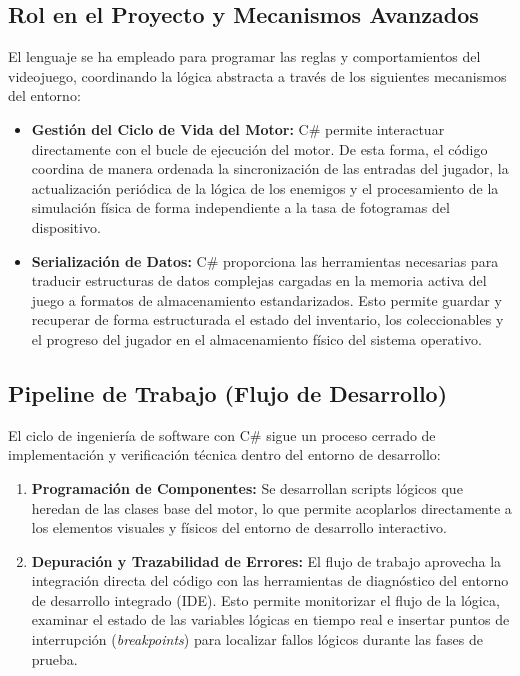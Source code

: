 \subsection{Rol en el Proyecto y Mecanismos Avanzados}
El lenguaje se ha empleado para programar las reglas y comportamientos del videojuego, coordinando la lógica abstracta a través de los siguientes mecanismos del entorno:

\begin{itemize}
    \item \textbf{Gestión del Ciclo de Vida del Motor:} C\# permite interactuar directamente con el bucle de ejecución del motor. De esta forma, el código coordina de manera ordenada la sincronización de las entradas del jugador, la actualización periódica de la lógica de los enemigos y el procesamiento de la simulación física de forma independiente a la tasa de fotogramas del dispositivo.
    
    \item \textbf{Serialización de Datos:} C\# proporciona las herramientas necesarias para traducir estructuras de datos complejas cargadas en la memoria activa del juego a formatos de almacenamiento estandarizados. Esto permite guardar y recuperar de forma estructurada el estado del inventario, los coleccionables y el progreso del jugador en el almacenamiento físico del sistema operativo.
\end{itemize}

\subsection{Pipeline de Trabajo (Flujo de Desarrollo)}
El ciclo de ingeniería de software con C\# sigue un proceso cerrado de implementación y verificación técnica dentro del entorno de desarrollo:

\begin{enumerate}
    \item \textbf{Programación de Componentes:} Se desarrollan scripts lógicos que heredan de las clases base del motor, lo que permite acoplarlos directamente a los elementos visuales y físicos del entorno de desarrollo interactivo.
    
    \item \textbf{Depuración y Trazabilidad de Errores:} El flujo de trabajo aprovecha la integración directa del código con las herramientas de diagnóstico del entorno de desarrollo integrado (IDE). Esto permite monitorizar el flujo de la lógica, examinar el estado de las variables lógicas en tiempo real e insertar puntos de interrupción (\textit{breakpoints}) para localizar fallos lógicos durante las fases de prueba.
\end{enumerate}

